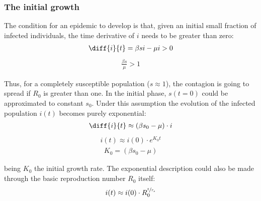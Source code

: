 \documentclass[DIV=12, BCOR=0pt]{scrartcl}  %
\begin{document}
  



  \subsubsection{The initial growth}
  
  The condition for an epidemic to develop is that, given an initial small fraction of infected individuals, the time derivative of $i$ needs to be greater than zero:
  \begin{align}
  	\diff{i}{t} = \beta s i - \mu i > 0 
  	\label{sir_growthCond}
  \end{align}
  \begin{align} %
  	\frac{\beta s}{\mu} > 1  %
  	\label{eq:sir_growthReq}
  \end{align}
  
  Thus, for a completely susceptible population ($s \approx 1$), the contagion is going to spread if $R_0$ is greater than one. In the initial phase, $s(t=0)$ could be approximated to constant $s_0$. %
  Under this assumption the evolution of the infected population $i(t)$ becomes purely exponential:
  \begin{align}
  	\diff{i}{t} \approx  (\beta s_0 - \mu) \cdot i 
  	\label{eq:sir_approxi}
  \end{align}
  \begin{align} %
  	i(t) \approx i(0) \cdot e^{K_0 t} 
  	\label{eq:sir_growthK0}
  \end{align}
  \begin{align} %
  	K_0 = (\beta s_0 - \mu)
  	\label{eq:sir_K0}
  \end{align}
	
	being $K_0$ the initial growth rate. The exponential description could also be made through %
	the basic reproduction number $R_0$ itself:
	\begin{align}
		i(t) \approx i(0) \cdot R_0^{\sfrac{t}{\tau_s}}
		\label{eq:sir_growthR0}
	\end{align}
	
\end{document}
